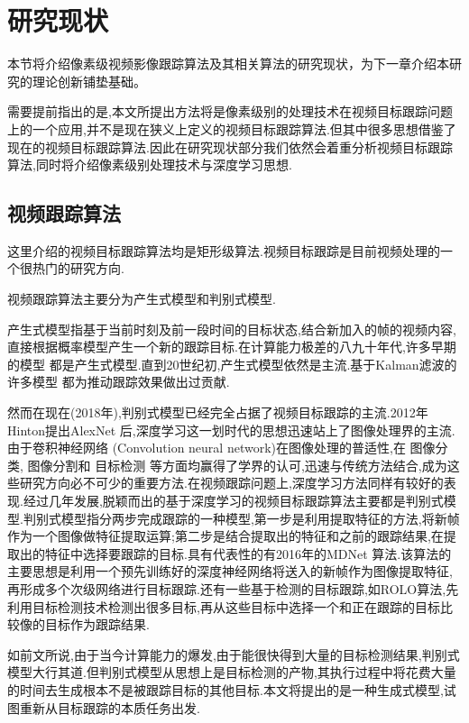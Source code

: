 \section{研究现状}
本节将介绍像素级视频影像跟踪算法及其相关算法的研究现状，为下一章介绍本研究的理论创新铺垫基础。
\par
需要提前指出的是,本文所提出方法将是像素级别的处理技术在视频目标跟踪问题上的一个应用,并不是现在狭义上定义的视频目标跟踪算法.但其中很多思想借鉴了现在的视频目标跟踪算法.因此在研究现状部分我们依然会着重分析视频目标跟踪算法,同时将介绍像素级别处理技术与深度学习思想.

\subsection{视频跟踪算法}
这里介绍的视频目标跟踪算法均是矩形级算法.视频目标跟踪是目前视频处理的一个很热门的研究方向.
\par
视频跟踪算法主要分为产生式模型和判别式模型.
\par
产生式模型指基于当前时刻及前一段时间的目标状态,结合新加入的帧的视频内容,直接根据概率模型产生一个新的跟踪目标.在计算能力极差的八九十年代,许多早期的模型
\supercite{schalkoff1982model}
都是产生式模型.直到20世纪初,产生式模型依然是主流.基于Kalman滤波的许多模型
\supercite{kim2002fast, weng2006video, comaniciu2003kernel}
都为推动跟踪效果做出过贡献.
\par
然而在现在(2018年),判别式模型已经完全占据了视频目标跟踪的主流.2012年Hinton提出AlexNet 
\supercite{krizhevsky2012imagenet} 
后,深度学习这一划时代的思想迅速站上了图像处理界的主流.由于卷积神经网络
\supercite{krizhevsky2012imagenet} 
(Convolution neural network)在图像处理的普适性,在
图像分类\supercite{krizhevsky2012imagenet, witten2016data, he2016deep},
图像分割\supercite{long2015fully}和
目标检测\supercite{ren2015faster, redmon2016you}
等方面均赢得了学界的认可,迅速与传统方法结合,成为这些研究方向必不可少的重要方法.在视频跟踪问题上,深度学习方法同样有较好的表现.经过几年发展,脱颖而出的基于深度学习的视频目标跟踪算法主要都是判别式模型.判别式模型指分两步完成跟踪的一种模型,第一步是利用提取特征的方法,将新帧作为一个图像做特征提取运算;第二步是结合提取出的特征和之前的跟踪结果,在提取出的特征中选择要跟踪的目标.具有代表性的有2016年的MDNet \supercite{nam2016mdnet}算法.该算法的主要思想是利用一个预先训练好的深度神经网络将送入的新帧作为图像提取特征,再形成多个次级网络进行目标跟踪.还有一些基于检测的目标跟踪,如ROLO\supercite{ning2016spatially}算法,先利用目标检测技术检测出很多目标,再从这些目标中选择一个和正在跟踪的目标比较像的目标作为跟踪结果.
\par
如前文所说,由于当今计算能力的爆发,由于能很快得到大量的目标检测结果,判别式模型大行其道.但判别式模型从思想上是目标检测的产物,其执行过程中将花费大量的时间去生成根本不是被跟踪目标的其他目标.本文将提出的是一种生成式模型,试图重新从目标跟踪的本质任务出发.

